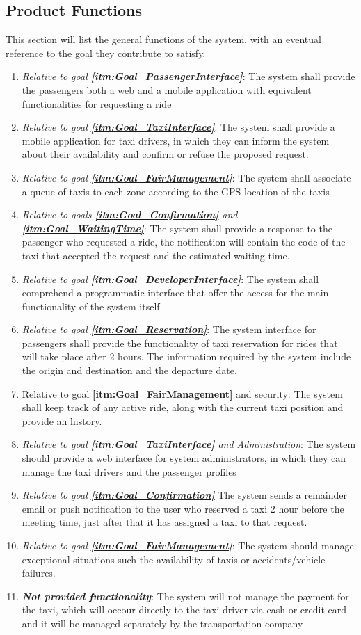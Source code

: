 \documentclass[11pt, a4paper,titlepage]{article}
\newcommand{\linkitm}[1]{\underline{\textbf{\ref{#1}}}}
\begin{document}
\subsection{Product Functions}
This section will list the general functions of the system, with an eventual reference to the goal they contribute to satisfy.
	\begin{enumerate}
		\item \textit{Relative to goal \linkitm{itm:Goal_PassengerInterface}}: The system shall provide the passengers both a web and a mobile application with equivalent functionalities for requesting a ride
		\item \textit{Relative to goal \linkitm{itm:Goal_TaxiInterface}}: The system shall provide a mobile application for taxi drivers, in which they can inform the system about their availability and confirm or refuse the proposed request.
		\item \textit{Relative to goal \linkitm{itm:Goal_FairManagement}}: The system shall associate a queue of taxis to each zone according to the GPS location of the taxis
		\item \textit{Relative to goals \linkitm{itm:Goal_Confirmation} and \linkitm{itm:Goal_WaitingTime}}: The system shall provide a response to the passenger who requested a ride, the notification will contain the code of the taxi that accepted the request and the estimated waiting time.
		\item \textit{Relative to goal \linkitm{itm:Goal_DeveloperInterface}}: The system shall comprehend a programmatic interface that offer the access for the main functionality of the system itself.
		\item \textit{Relative to goal \linkitm{itm:Goal_Reservation}}: The system interface for passengers shall provide the functionality of taxi reservation for rides that will take place after 2 hours. The information required by the system include the origin and destination and the departure date.
		\item {Relative to goal \linkitm{itm:Goal_FairManagement} and security}: The system shall keep track of any active ride, along with the current taxi position and provide an history.
		\item \textit{Relative to goal \linkitm{itm:Goal_TaxiInterface} and Administration}: The system should provide a web interface for system administrators, in which they can manage the taxi drivers and the passenger profiles
		\item \textit{Relative to goal \linkitm{itm:Goal_Confirmation}} The system sends a remainder email or push notification to the user who reserved a taxi 2 hour before the meeting time, just after that it has assigned a taxi to that request.
		\item \textit{Relative to goal \linkitm{itm:Goal_FairManagement}}: The system should manage exceptional situations such the availability of taxis or accidents/vehicle failures.
		\item \textit{\textbf{Not provided functionality}}: The system will not manage the payment for the taxi, which will occour directly to the taxi driver via cash or credit card and it will be managed separately by the transportation company
		
	\end{enumerate}
\end{document}
